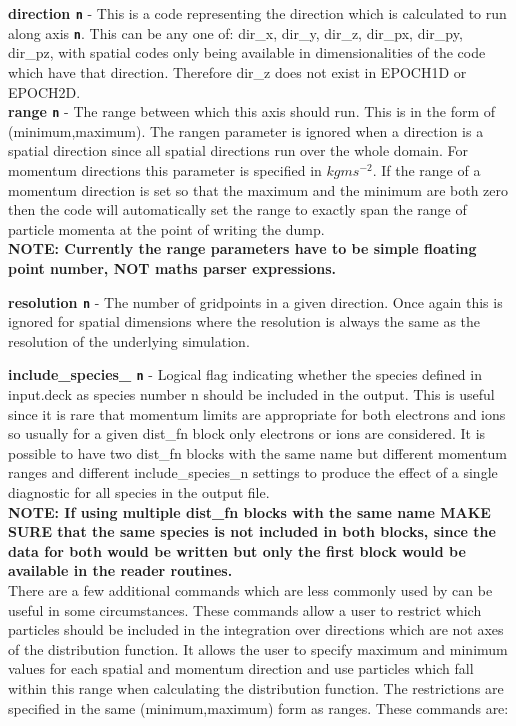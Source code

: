 \documentclass[12pt,a4paper]{article}
\newcommand{\emphtext}{\color{warwickdark} \fontfamily{phv}\selectfont\Large\bf}
\newcommand{\inlinecode}[1]{{\color{warwickred} \bf\texttt{#1}}}
\begin{document}
{\emphtext direction\inlinecode{n}} - This is a code representing the direction
which is calculated to run along axis \inlinecode{n}. This can be any one of:
dir\_x, dir\_y, dir\_z, dir\_px, dir\_py, dir\_pz, with spatial codes only
being available in dimensionalities of the code which have that
direction. Therefore dir\_z does not exist in EPOCH1D or EPOCH2D.\\

{\emphtext range\inlinecode{n}} - The range between which this axis should
run. This is in the form of (minimum,maximum). The rangen parameter is ignored
when a direction is a spatial direction since all spatial directions run over
the whole domain. For momentum directions this parameter is specified in
$kgms^{-2}$. If the range of a momentum direction is set so that the maximum
and the minimum are both zero then the code will automatically set the range to
exactly span the range of particle momenta at the point of writing the dump.\\

{\emphtext NOTE: Currently the range parameters have to be simple floating
point number, NOT maths parser expressions.}

{\emphtext resolution\inlinecode{n}} - The number of gridpoints in a given
direction. Once again this is ignored for spatial dimensions where the
resolution is always the same as the resolution of the underlying simulation.

{\emphtext include\_species\_\inlinecode{n}} - Logical flag indicating whether
the species defined in input.deck as species number n should be included in the
output. This is useful since it is rare that momentum limits are appropriate
for both electrons and ions so usually for a given dist\_fn block only
electrons or ions are considered. It is possible to have two dist\_fn blocks
with the same name but different momentum ranges and different
include\_species\_n settings to produce the effect of a single diagnostic for
all species in the output file.\\

{\emphtext NOTE: If using multiple dist\_fn blocks with the same name MAKE SURE
that the same species is not included in both blocks, since the data for both
would be written but only the first block would be available in the reader
routines.}\\

There are a few additional commands which are less commonly used by can be
useful in some circumstances. These commands allow a user to restrict which
particles should be included in the integration over directions which are not
axes of the distribution function. It allows the user to specify maximum and
minimum values for each spatial and momentum direction and use particles which
fall within this range when calculating the distribution function. The
restrictions are specified in the same (minimum,maximum) form as ranges. These
commands are:\\
\end{document}
